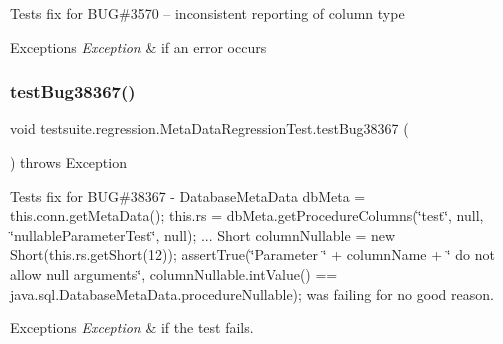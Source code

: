 Tests fix for B\+UG\#3570 -- inconsistent reporting of column type


\begin{DoxyExceptions}{Exceptions}
{\em Exception} & if an error occurs \\
\hline
\end{DoxyExceptions}
\mbox{\label{classtestsuite_1_1regression_1_1_meta_data_regression_test_a8ef9287c41ad42ae8faf6e7bb34a6fcb}} 
\subsubsection{\texorpdfstring{test\+Bug38367()}{testBug38367()}}
{\footnotesize\ttfamily void testsuite.\+regression.\+Meta\+Data\+Regression\+Test.\+test\+Bug38367 (\begin{DoxyParamCaption}{ }\end{DoxyParamCaption}) throws Exception}

Tests fix for B\+UG\#38367 -\/ Database\+Meta\+Data db\+Meta = this.\+conn.\+get\+Meta\+Data(); this.\+rs = db\+Meta.\+get\+Procedure\+Columns(\char`\"{}test\char`\"{}, null, \char`\"{}nullable\+Parameter\+Test\char`\"{}, null); ... Short column\+Nullable = new Short(this.\+rs.\+get\+Short(12)); assert\+True(\char`\"{}\+Parameter \char`\"{} + column\+Name + \char`\"{} do not allow null arguments\char`\"{}, column\+Nullable.\+int\+Value() == java.\+sql.\+Database\+Meta\+Data.\+procedure\+Nullable); was failing for no good reason.


\begin{DoxyExceptions}{Exceptions}
{\em Exception} & if the test fails. \\
\hline
\end{DoxyExceptions}
\mbox{\label{classtestsuite_1_1regression_1_1_meta_data_regression_test_a797ade6bff170eaf2551f5731a3dd7ef}} 
